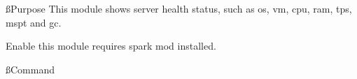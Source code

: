 
\ss{Purpose}
This module shows server health status, such as os, vm, cpu, ram, tps, mspt and gc.

\begin{warn}{}
    Enable this module requires spark mod installed.
\end{warn}

\ss{Command}
